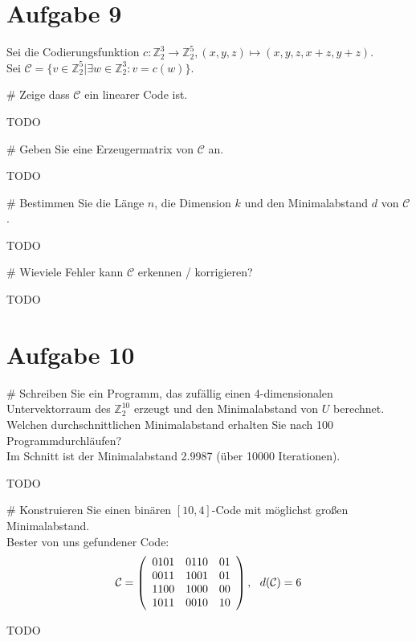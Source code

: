 \section*{Aufgabe 9}

Sei die Codierungsfunktion $c: \mathbb{Z}^3_2 \rightarrow \mathbb{Z}^5_2 , (x,y,z) \mapsto (x,y,z,x+z,y+z)$.\\
Sei $\mathcal{C} = \lbrace v \in \mathbb{Z}^5_2 | \exists w \in \mathbb{Z}^3_2: v = c(w) \rbrace$.
\begin{myList}
#
Zeige dass $\mathcal{C}$ ein linearer Code ist.

TODO

#
Geben Sie eine Erzeugermatrix von $\mathcal{C}$ an.

TODO

#
Bestimmen Sie die Länge $n$, die Dimension $k$ und den Minimalabstand $d$ von $\mathcal{C}$.

TODO

#
Wieviele Fehler kann $\mathcal{C}$ erkennen /  korrigieren?

TODO
\end{myList}

\section*{Aufgabe 10}
\begin{myList}
#
Schreiben Sie ein Programm, das zufällig einen 4-dimensionalen Untervektorraum des $\mathbb{Z}^10_2$ erzeugt und den Minimalabstand von $U$ berechnet.
Welchen durchschnittlichen Minimalabstand erhalten Sie nach 100 Programmdurchläufen?\\
Im Schnitt ist der Minimalabstand 2.9987 (über 10000 Iterationen).

TODO

#
Konstruieren Sie einen binären $[10,4]$-Code mit möglichst großen Minimalabstand.\\
Bester von uns gefundener Code:\\
\begin{align*}
\mathcal{C} = \left( \begin{array}{ccc}
0101&0110&01\\
0011&1001&01\\
1100&1000&00\\
1011&0010&10
\end{array} \right),~~d(\mathcal{C})=6
\end{align*}

TODO
\end{myList}






